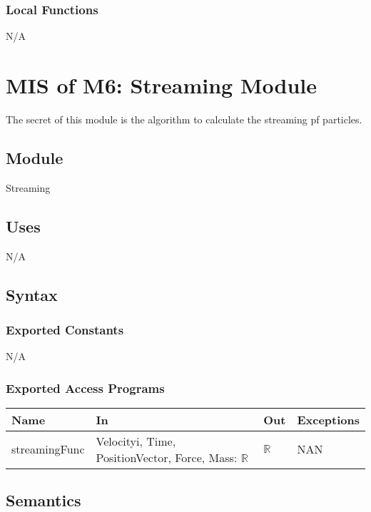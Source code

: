 \documentclass[12pt, titlepage]{article}
\begin{document}
\subsubsection{Local Functions}

N/A

\newpage

\section{MIS of M6: Streaming Module} \label{STModule}

The secret of this module is the algorithm to calculate the streaming pf particles.

\subsection{Module}

Streaming

\subsection{Uses}
N/A
\subsection{Syntax}

\subsubsection{Exported Constants}
N/A

\subsubsection{Exported Access Programs}

\begin{center}
	\begin{tabular}{p{3cm} p{3cm} p{3cm} p{2cm}}
		\hline
		\textbf{Name} & \textbf{In} & \textbf{Out} & \textbf{Exceptions} \\
		\hline
		streamingFunc & Velocityi, Time, PositionVector, Force, Mass: $\mathbb{R}$ & $\mathbb{R}$ & NAN \\
		\hline
	\end{tabular}
\end{center}

\subsection{Semantics}
\end{document}
